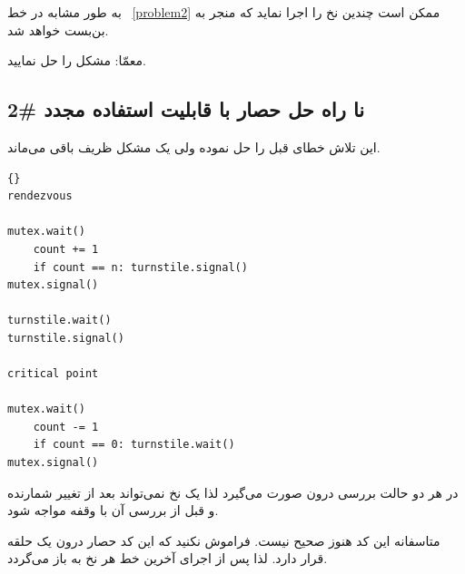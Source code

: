 \documentclass{book}
\newcommand{\clearemptydoublepage}{\newpage\cleardoublepage}
\begin{document}
    به طور مشابه در خط ~\ref{problem2} ممکن است چندین نخ   را اجرا نماید که منجر به بن‌بست خواهد شد. 

    معمّا: مشکل را حل نمایید. 

\clearemptydoublepage
\subsection {  نا راه حل حصار با قابلیت استفاده مجدد \#2}

    این تلاش خطای قبل را حل نموده ولی یک مشکل ظریف باقی می‌ماند. 

\begin{latin}
\begin{latin}
\begin{lstlisting}[title=\rl{ نا راه حل حصار با قابلیت استفاده مجدد}]{} 
rendezvous

mutex.wait()
    count += 1
    if count == n: turnstile.signal()
mutex.signal()

turnstile.wait()
turnstile.signal()

critical point

mutex.wait()
    count -= 1
    if count == 0: turnstile.wait()
mutex.signal()
\end{lstlisting}
\end{latin}
\end{latin}

    در هر دو حالت بررسی درون  صورت می‌گیرد لذا یک نخ نمی‌تواند بعد از تغییر شمارنده و قبل از بررسی آن با وقفه مواجه شود. 

    متاسفانه این کد هنوز صحیح نیست. فراموش نکنید که این کد حصار درون یک حلقه قرار دارد. لذا پس از اجرای آخرین خط 
    هر نخ به  باز می‌گردد. 
\end{document}
